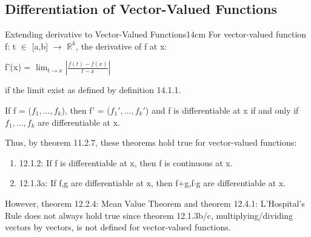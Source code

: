 \subsection{ Differentiation of Vector-Valued Functions }

    \begin{definition}{Extending derivative to Vector-Valued Functions}{14cm}
        For vector-valued function f: t $\in$ [a,b] $\rightarrow$ $\mathbb{R}^k$,
        the derivative of f at x:

        \hspace{1cm}
        f'(x) = $\lim_{t \rightarrow x} |\frac{f(t)-f(x)}{t-x}|$

        if the limit exist as defined by {\color{blue} definition 14.1.1}.

        \vspace{0.2cm}

        If f = ($f_1, ... , f_k$), then f' = ($f_1', ... , f_k'$)
        and f is differentiable at x if and only if $f_1, ... , f_k$ are
        differentiable at x.

        \vspace{0.1cm}

        Thus, by {\color{red} theorem 11.2.7}, these theorems hold true
        for vector-valued functions:

        \begin{enumerate}[label=-, leftmargin=0.7cm, itemsep=0.1cm]
            \item {\color{red} 12.1.2}:
                If f is differentiable at x, then f is continuous at x.
            
            \item {\color{red} 12.1.3a}:
                If f,g are differentiable at x, then f+g,f$\cdot$g
                are differentiable at x. 
        \end{enumerate}

        \vspace{0.1cm}

        However, {\color{red} theorem 12.2.4: Mean Value Theorem}
        and {\color{red} theorem 12.4.1: L'Hospital's Rule}
        does not always hold true since {\color{red} theorem 12.1.3b/c},
        multiplying/dividing vectors by vectors,
        is not defined for vector-valued functions.
    \end{definition}

    \vspace{0.5cm}



